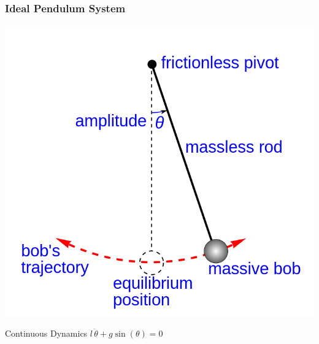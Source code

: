 \documentclass[12pt]{beamer}
\begin{document}
\begin{frame}
\frametitle{Ideal Pendulum System}

\begin{center}
\includegraphics[width=.4\linewidth]{pic/Simple_gravity_pendulum.png}
\end{center}

\begin{block}{Continuous Dynamics}
\centering
$l \, \ddot\theta + g \sin(\theta) = 0$
\end{block}

\end{frame}
\end{document}

